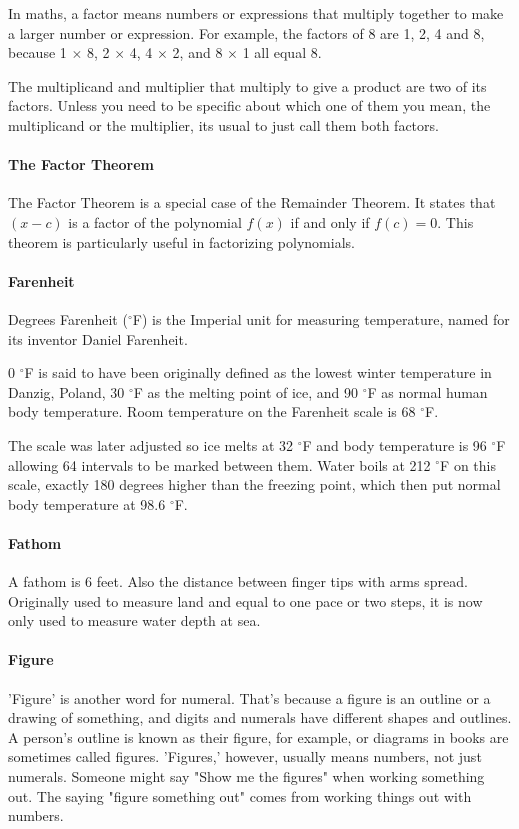 \documentclass[12pt]{article}
\begin{document}
In maths, a factor means numbers or expressions that multiply together to make a larger number or expression. For example, the factors of 8 are 1, 2, 4 and 8, because 1 $\times$ 8, 2 $\times$ 4, 4 $\times$ 2, and 8 $\times$ 1 all equal 8.

The multiplicand and multiplier that multiply to give a product are two of its factors. Unless you need to be specific about which one of them you mean, the multiplicand or the multiplier, its usual to just call them both factors.

\paragraph{The Factor Theorem}
The Factor Theorem is a special case of the Remainder Theorem. It states that $(x - c)$ is a factor of the polynomial $f(x)$ if and only if $f(c) = 0$. This theorem is particularly useful in factorizing polynomials.

\paragraph{Farenheit} Degrees Farenheit ($^\circ$F) is the Imperial unit for measuring temperature, named for its inventor Daniel Farenheit.

0 $^\circ$F is said to have been originally defined as the lowest winter temperature in Danzig, Poland, 30 $^\circ$F as the melting point of ice, and 90 $^\circ$F as normal human body temperature. Room temperature on the Farenheit scale is 68 $^\circ$F.

The scale was later adjusted so ice melts at 32 $^\circ$F and body temperature is 96 $^\circ$F allowing 64 intervals to be marked between them. Water boils at 212 $^\circ$F on this scale, exactly 180 degrees higher than the freezing point, which then put normal body temperature at 98.6 $^\circ$F.

\paragraph{Fathom}
A fathom is 6 feet. Also the distance between finger tips with arms spread. Originally used to measure land and equal to one pace or two steps, it is now only used to measure water depth at sea.

\paragraph{Figure}
'Figure' is another word for numeral. That's because a figure is an outline or a drawing of something, and digits and numerals have different shapes and outlines. A person's outline is known as their figure, for example, or diagrams in books are sometimes called figures. 'Figures,' however, usually means numbers, not just numerals. Someone might say "Show me the figures" when working something out. The saying "figure something out" comes from working things out with numbers.
\end{document}

